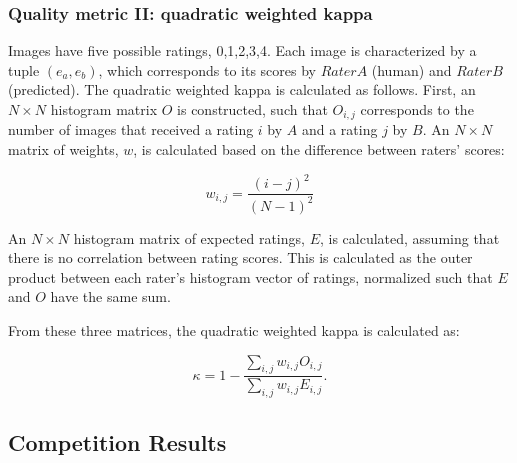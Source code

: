 \begin{frame}\frametitle{Quality metric II: quadratic weighted kappa} 

\footnotesize { %
Images have five possible ratings, 0,1,2,3,4.  Each image is characterized by a tuple $ (e_a,e_b) $, which corresponds to its scores by $Rater A$ (human) and $Rater B$ (predicted).  The quadratic weighted kappa is calculated as follows. First, an $N\times N$ histogram matrix $O$ is constructed, such that $O_{i,j}$ corresponds to the number of images that received a rating $i$ by $A$ and a rating $j$ by $B$. An $N\times N$ matrix of weights, $w$, is calculated based on the difference between raters' scores:

\[ w_{i,j} = \frac{\left(i-j\right)^2}{\left(N-1\right)^2} \]

An $N\times N$ histogram matrix of expected ratings, $E$, is calculated, assuming that there is no correlation between rating scores.  This is calculated as the outer product between each rater's histogram vector of ratings, normalized such that $E$ and $O$ have the same sum.

From these three matrices, the quadratic weighted kappa is calculated as: 

\[ \kappa=1-\frac{\sum_{i,j}w_{i,j}O_{i,j}}{\sum_{i,j}w_{i,j}E_{i,j}}. \]
}

\end{frame}

\subsection{Competition Results}

